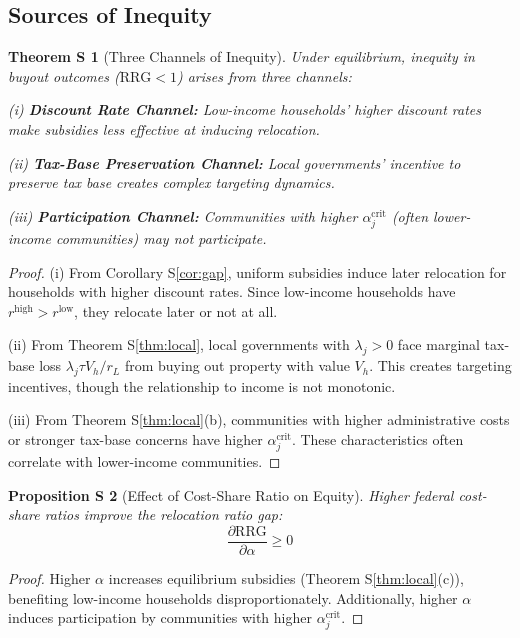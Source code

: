 \documentclass[11pt,letterpaper]{article}
\newtheorem{theoremS}{Theorem S}
\newtheorem{propositionS}[theoremS]{Proposition S}
\theoremstyle{definition}
\begin{document}
\subsection{Sources of Inequity}

\begin{theoremS}[Three Channels of Inequity]\label{thm:channels}
Under equilibrium, inequity in buyout outcomes ($\text{RRG} < 1$) arises from three channels:

(i) \textbf{Discount Rate Channel:} Low-income households' higher discount rates make subsidies less effective at inducing relocation.

(ii) \textbf{Tax-Base Preservation Channel:} Local governments' incentive to preserve tax base creates complex targeting dynamics.

(iii) \textbf{Participation Channel:} Communities with higher $\alpha_j^{\text{crit}}$ (often lower-income communities) may not participate.
\end{theoremS}

\begin{proof}
(i) From Corollary S\ref{cor:gap}, uniform subsidies induce later relocation for households with higher discount rates. Since low-income households have $r^{\text{high}} > r^{\text{low}}$, they relocate later or not at all.

(ii) From Theorem S\ref{thm:local}, local governments with $\lambda_j > 0$ face marginal tax-base loss $\lambda_j \tau V_h / r_L$ from buying out property with value $V_h$. This creates targeting incentives, though the relationship to income is not monotonic.

(iii) From Theorem S\ref{thm:local}(b), communities with higher administrative costs or stronger tax-base concerns have higher $\alpha_j^{\text{crit}}$. These characteristics often correlate with lower-income communities.
\end{proof}

\begin{propositionS}[Effect of Cost-Share Ratio on Equity]
Higher federal cost-share ratios improve the relocation ratio gap:
\begin{equation}
\frac{\partial \text{RRG}}{\partial \alpha} \geq 0
\end{equation}
\end{propositionS}

\begin{proof}
Higher $\alpha$ increases equilibrium subsidies (Theorem S\ref{thm:local}(c)), benefiting low-income households disproportionately. Additionally, higher $\alpha$ induces participation by communities with higher $\alpha_j^{\text{crit}}$.
\end{proof}
\end{document}
